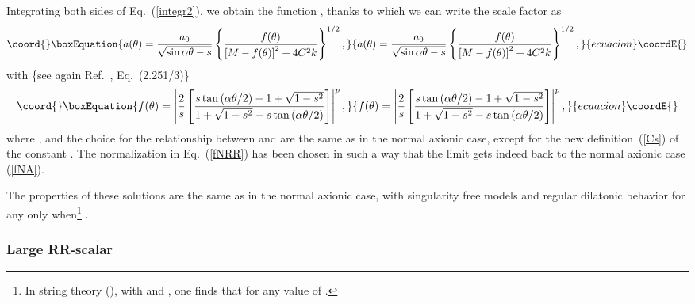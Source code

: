 \documentclass[a4paper,aps,twocolumn,prd,showpacs,nofootinbib]{revtex4}
\begin{document}
Integrating both sides of Eq.~(\ref{integr2}), we obtain the function
\coordHE{}, thanks to which we can write the scale factor as
\begin{equation}\coord{}\boxEquation{
a(\theta) = \frac{a_0}{\sqrt{\sin\alpha\theta -
s}}\left\{\frac{f(\theta)} {\left[ M - f(\theta)\right]^2 + 4C^2k }
\right\}^{1/2},
}{
a(\theta) = \frac{a_0}{\sqrt{\sin\alpha\theta -
s}}\left\{\frac{f(\theta)} {\left[ M - f(\theta)\right]^2 + 4C^2k }
\right\}^{1/2},
}{ecuacion}\coordE{}\end{equation}
with \{see again Ref.~\cite{Grad}, Eq.~(2.251/3)\}
\begin{equation}\coord{}\boxEquation{
f(\theta) = \left| {2\over s}
\left[\frac{s\tan\left(\alpha\theta/2\right) - 1 + \sqrt{1 - s^2}}{1 +
\sqrt{1 -s^2}- s\tan\left(\alpha\theta/2\right)}\right]\right|^p,
\label{fNRR}
}{
f(\theta) = \left| {2\over s}
\left[\frac{s\tan\left(\alpha\theta/2\right) - 1 + \sqrt{1 - s^2}}{1 +
\sqrt{1 -s^2}- s\tan\left(\alpha\theta/2\right)}\right]\right|^p,
}{ecuacion}\coordE{}\end{equation}
where \coordHE{}, \coordHE{} and the choice for the relationship between
\coordHE{} and \coordHE{} are the same as in the normal axionic case,
except for the new definition~(\ref{Cs}) of the constant \coordHE{}. The
normalization in Eq.~(\ref{fNRR}) has been chosen in such a way that
the limit \coordHE{} gets indeed back to the normal axionic case
(\ref{fNA}).

The properties of these solutions are the same as in the normal
axionic case, with singularity free models and regular dilatonic
behavior for any \coordHE{} only when\footnote{In string theory
(\coordHE{}), with \coordHE{} and \coordHE{}, one finds that \coordHE{} for any value of \coordHE{}.}  \coordHE{}.

\subsubsection{Large RR-scalar}
\end{document}
